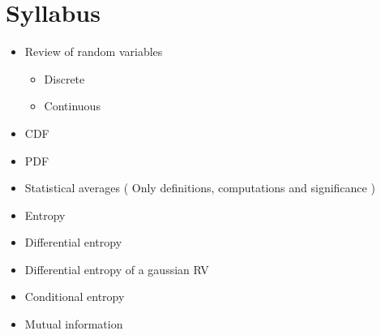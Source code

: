 \documentclass[../course]{subfiles}
\begin{document}
\section{Syllabus}

\begin{itemize}

    \item Review of random variables

        \begin{itemize}
            \item Discrete
            \item Continuous
        \end{itemize}

    \item CDF
    \item PDF
    \item Statistical averages ( Only definitions, computations and significance )
    \item Entropy
    \item Differential entropy
    \item Differential entropy of a gaussian RV
    \item Conditional entropy
    \item Mutual information
\end{itemize}
\end{document}

